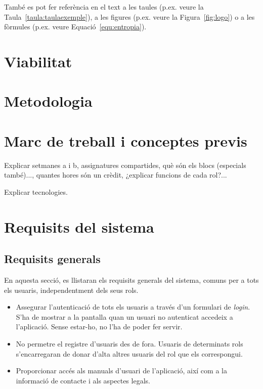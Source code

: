 \documentclass[a4paper,12pt]{ThesisStyle}
\begin{document}
També es pot fer referència en el text a les taules (p.ex. veure la Taula~\ref{taula:taulaexemple}), a les figures (p.ex. veure la Figura~\ref{fig:logo})
o a les fòrmules (p.ex. veure Equació~\ref{equ:entropia}).



\chapter{Viabilitat}
\label{cap:viabilitat}



\chapter{Metodologia}
\label{cap:metodologia}



\chapter{Marc de treball i conceptes previs}
\label{cap:marcdetreball}
Explicar setmanes a i b, assignatures compartides, què són els blocs (especials també)..., quantes hores
són un crèdit, ¿explicar funcions de cada rol?... 



Explicar tecnologies.



\chapter{Requisits del sistema}
\label{cap:requisits}

\section{Requisits generals}
\label{sec:requisits_generals} %

En aquesta secció, es llistaran els requisits generals del sistema, comuns per a tots els usuaris, independentment dels seus rols.

\begin{itemize}
  \item Assegurar l'autenticació de tots els usuaris a través d'un formulari de \emph{login}. S'ha de mostrar a la pantalla quan un usuari no autenticat accedeix a l'aplicació. Sense estar-ho, no l'ha de poder fer servir.
  \item No permetre el registre d'usuaris des de fora. Usuaris de determinats rols s'encarregaran de donar d'alta altres usuaris del rol que els correspongui.
  \item Proporcionar accés als manuals d'usuari de l'aplicació, així com a la informació de contacte i als aspectes legals.
\end{itemize}
\end{document}

